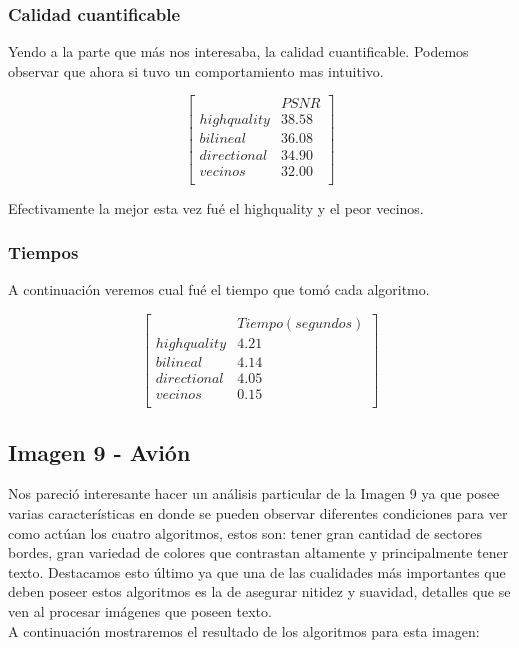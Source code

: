 {\subsubsection{Calidad cuantificable}
Yendo a la parte que más nos interesaba, la calidad cuantificable. Podemos observar que ahora si tuvo un comportamiento mas intuitivo.

$$ 
\begin{bmatrix}
           &      PSNR     \\
       highquality    &   38.58   \\
       bilineal    &      36.08  \\
       directional    &      34.90    \\
       vecinos   &      32.00      \\
\end{bmatrix} 
$$

Efectivamente la mejor esta vez fué el highquality y el peor vecinos.
\subsubsection{Tiempos}
A continuación veremos cual fué el tiempo que tomó cada algoritmo.

$$ 
\begin{bmatrix}
           &      Tiempo (segundos)     \\
       highquality    &   4.21   \\
       bilineal    &      4.14   \\
       directional    &      4.05    \\
       vecinos   &      0.15      \\
\end{bmatrix} 
$$

\clearpage
\subsection{Imagen 9 - Avión}

Nos pareció interesante hacer un análisis particular de la Imagen 9 ya que posee varias características en donde se pueden observar diferentes condiciones para ver como actúan los cuatro algoritmos, estos son: tener gran cantidad de sectores bordes, gran variedad de colores que contrastan altamente y principalmente tener texto. Destacamos esto último ya que una de las cualidades más importantes que deben poseer estos algoritmos es la de asegurar nitidez y suavidad, detalles que se ven al procesar imágenes que poseen texto. \\
A continuación mostraremos el resultado de los algoritmos para esta imagen:

}
